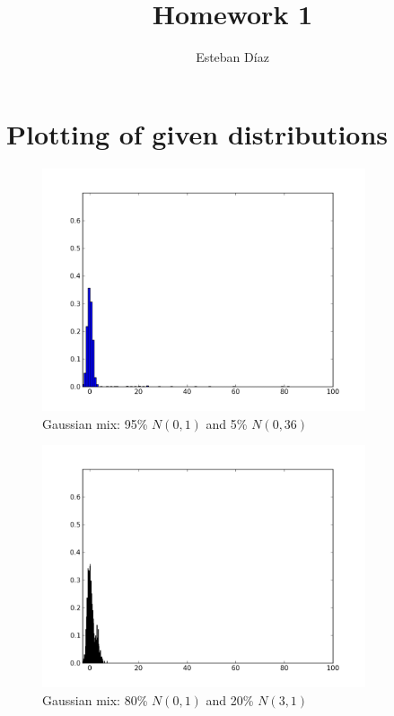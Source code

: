 \documentclass[10pt]{article}
\author{Esteban D\'{i}az}
\title{Homework 1}{}
\begin{document}
\maketitle

\section{Plotting of given distributions}
\begin{figure}[H]
    \centering
    \includegraphics[width=0.85\textwidth]{../fig1.png}
    \caption{Gaussian mix: 95\% $N(0,1)$ and 5\% $N(0,36)$}
    \label{fig:fig1}
\end{figure}

\begin{figure}[H]
    \centering
    \includegraphics[width=0.85\textwidth]{../fig2.png}
    \caption{Gaussian mix: 80\% $N(0,1)$ and 20\% $N(3,1)$}
    \label{fig:fig2}
\end{figure}
\end{document}

